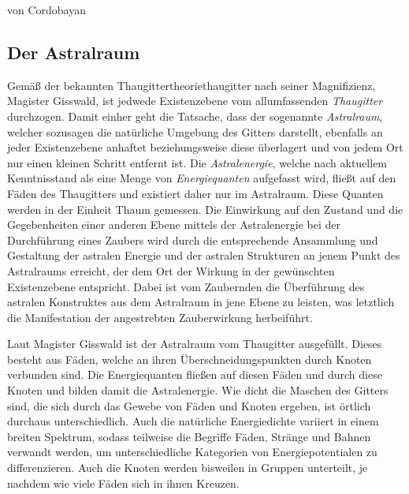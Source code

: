 \documentclass[a5paper,8pt]{book}
\begin{document}
von Cordobayan

\subsection{Der Astralraum}
\begin{multicols}{2}
Gemäß der bekannten Thau\-git\-ter\-theo\-riethaugitter nach seiner Magnifizienz, Magister Gisswald, ist
jedwede Existenzebene vom allumfassenden \textit{Thaugitter} durchzogen. Damit einher geht die Tatsache, dass der
sogenannte \textit{Astralraum}, welcher sozusagen die natürliche Umgebung des Gitters darstellt, ebenfalls an jeder
Existenzebene anhaftet beziehungsweise diese überlagert und von jedem Ort nur einen kleinen Schritt
entfernt ist. Die \textit{Astralenergie}, welche nach aktuellem Kenntnisstand als eine Menge von
\textit{Energiequanten} aufgefasst wird, fließt auf den Fäden des Thaugitters und existiert daher nur im
Astralraum. Diese Quanten werden in der Einheit Thaum gemessen. Die Einwirkung auf den Zustand und die
Gegebenheiten einer anderen Ebene mittels der Astralenergie bei der Durchführung eines Zaubers wird durch die
entsprechende Ansammlung und Gestaltung der astralen Energie und der astralen Strukturen an jenem Punkt des
Astralraums erreicht, der dem Ort der Wirkung in der gewünschten Existenzebene entspricht. Dabei ist vom
Zaubernden die Überführung des astralen Konstruktes aus dem Astralraum in jene Ebene zu leisten, was
letztlich die Manifestation der angestrebten Zauberwirkung herbeiführt.

Laut Magister Gisswald ist der Astralraum vom Thaugitter ausgefüllt. Dieses besteht aus Fäden, welche an
ihren Überschneidungspunkten durch Knoten verbunden sind. Die Energiequanten fließen auf diesen Fäden und durch diese
Knoten und bilden damit die Astralenergie. Wie dicht die Maschen des Gitters sind, die sich durch das Gewebe von Fäden
und Knoten ergeben, ist örtlich durchaus unterschiedlich. Auch die natürliche Energiedichte variiert in einem breiten
Spektrum, sodass teilweise die Begriffe Fäden, Stränge und Bahnen verwandt werden, um unterschiedliche Kategorien
von Energiepotentialen zu differenzieren. Auch die Knoten werden bisweilen in Gruppen unterteilt, je nachdem wie viele
Fäden sich in ihnen Kreuzen.


\end{multicols}
\end{document}
